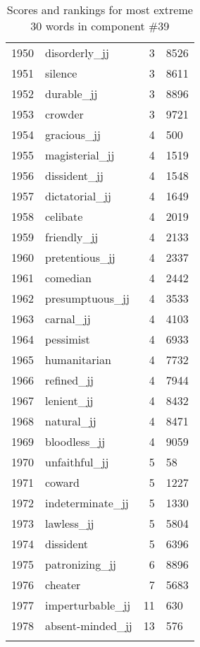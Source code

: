\begin{longtable}[!htbp]{| rlr@{.}l |}
    1950 & disorderly\_jj & 3 & 8526 \\
    1951 & silence & 3 & 8611 \\
    1952 & durable\_jj & 3 & 8896 \\
    1953 & crowder & 3 & 9721 \\
    1954 & gracious\_jj & 4 & 500 \\
    1955 & magisterial\_jj & 4 & 1519 \\
    1956 & dissident\_jj & 4 & 1548 \\
    1957 & dictatorial\_jj & 4 & 1649 \\
    1958 & celibate & 4 & 2019 \\
    1959 & friendly\_jj & 4 & 2133 \\
    1960 & pretentious\_jj & 4 & 2337 \\
    1961 & comedian & 4 & 2442 \\
    1962 & presumptuous\_jj & 4 & 3533 \\
    1963 & carnal\_jj & 4 & 4103 \\
    1964 & pessimist & 4 & 6933 \\
    1965 & humanitarian & 4 & 7732 \\
    1966 & refined\_jj & 4 & 7944 \\
    1967 & lenient\_jj & 4 & 8432 \\
    1968 & natural\_jj & 4 & 8471 \\
    1969 & bloodless\_jj & 4 & 9059 \\
    1970 & unfaithful\_jj & 5 & 58 \\
    1971 & coward & 5 & 1227 \\
    1972 & indeterminate\_jj & 5 & 1330 \\
    1973 & lawless\_jj & 5 & 5804 \\
    1974 & dissident & 5 & 6396 \\
    1975 & patronizing\_jj & 6 & 8896 \\
    1976 & cheater & 7 & 5683 \\
    1977 & imperturbable\_jj & 11 & 630 \\
    1978 & absent-minded\_jj & 13 & 576 \\
    \hline
    \caption{Scores and rankings for most extreme 30 words in component \#39} \\
\end{longtable}
